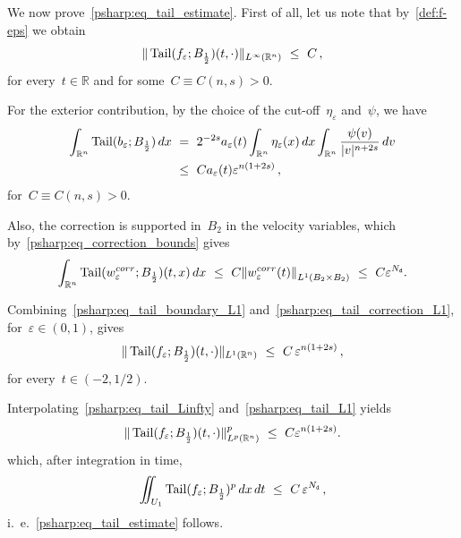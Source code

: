 \documentclass[leqno,10pt]{amsart}
\theoremstyle{plain}
\theoremstyle{remark}
\numberwithin{equation}{section}
\DeclareMathOperator*{\tail}{{\rm Tail}}
\def\dx{\,{\rm d}x}
\def\dv{\,{\rm d}v}
\def\dt{\,{\rm d}t}
\def\er{\mathbb{R}}
\newcommand{\norma}[1]{{\left\|#1\right\|}}
\newcommand{\eps}{\varepsilon}
\begin{document}
{We now prove~\eqref{psharp:eq_tail_estimate}. First of all, let us note that by~\eqref{def:f-eps} we obtain
\begin{equation}\label{psharp:eq_tail_Linfty}
\|\tail(f_\eps;B_\frac{1}{2})(t,\cdot)\|_{L^\infty(\er^n)}
\ \leq  \  C\,,
\end{equation}
for every~$t\in\er$ and for some~$C \equiv C(n,s)>0$. 

For the exterior contribution, by the choice of the cut-off~$\eta_\eps$ and~$\psi$, we have
\begin{equation}\label{psharp:eq_tail_boundary_L1}
\begin{aligned}
\int_{\er^n}\tail(b_\eps;B_\frac{1}{2})\dx
& \ = \ 2^{-2s}a_\eps(t)\int_{\er^n}\eta_\eps(x)\dx
\int_{\er^n}\frac{\psi(v)}{|v|^{n+2s}}\dv\\
& \ \leq  \ C a_\eps(t)\eps^{n(1+2s)}\,,
\end{aligned}
\end{equation}
for~$C \equiv C(n,s)>0$.


Also, the correction is supported in~$B_{2}$ in the velocity variables, which by~\eqref{psharp:eq_correction_bounds} gives
\begin{equation}\label{psharp:eq_tail_correction_L1}
\int_{\er^n}\tail(w_\eps^{\rm corr};B_\frac{1}{2})(t,x)\dx
\ \leq \ C\norma{w_\eps^{\rm corr}(t)}_{L^1(B_2\times B_2)}
 \ \leq \ C\eps^{N_{\tt d}}.
\end{equation}


Combining~\eqref{psharp:eq_tail_boundary_L1} and~\eqref{psharp:eq_tail_correction_L1}, for~$\eps \in (0,1)$, gives
\begin{equation}\label{psharp:eq_tail_L1}
\|\tail(f_\eps;B_\frac{1}{2})(t,\cdot)\|_{L^1(\er^n)}
\ \leq \ C\,\eps^{n(1+2s)}\,,
\end{equation}
for every~$t \in (-2,1/2)$. 

Interpolating~\eqref{psharp:eq_tail_Linfty} and~\eqref{psharp:eq_tail_L1} yields
\[
\|\tail(f_\eps;B_\frac{1}{2})(t,\cdot)\|_{L^p(\er^n)}^p
\ \leq \ C\eps^{n(1+2s)}.
\]
which, after integration in time,
\[
\iint_{U_1}
\tail(f_\eps;B_\frac{1}{2})^p\dx\dt
\ \leq \  C\,\eps^{N_{\tt d}}\,,
\]
i.~\!e.~\eqref{psharp:eq_tail_estimate} follows.

}
\end{document}
